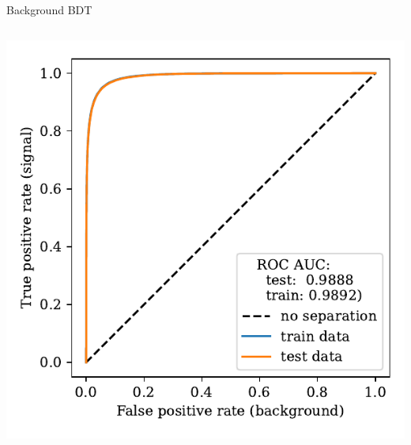 \documentclass[aspectratio=1610, 10pt]{beamer}
\begin{document}
\begin{frame}{Background BDT}
\begin{columns}
    \begin{column}{0.33\textwidth}
      \centering
      \includegraphics[width=\textwidth]{images/backup/bkg_roc.pdf}
    \end{column}
  \end{columns}
\end{frame}
\end{document}
